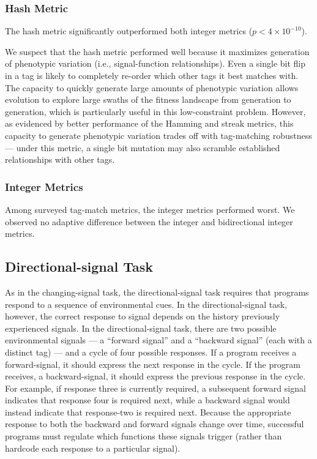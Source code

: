 \subsubsection{Hash Metric}

The hash metric significantly outperformed both integer metrics ($p < 4\times10^{-10}$).

We suspect that the hash metric performed well because it maximizes generation of phenotypic variation (i.e., signal-function relationships).
Even a single bit flip in a tag is likely to completely re-order which other tags it best matches with.
The capacity to quickly generate large amounts of phenotypic variation allows evolution to explore large swaths of the fitness landscape from generation to generation, which is particularly useful in this low-constraint problem.
However, as evidenced by better performance of the Hamming and streak metrics, this capacity to generate phenotypic variation trades off with tag-matching robustness --- under this metric, a single bit mutation may also scramble established relationships with other tags.

\subsubsection{Integer Metrics}

Among surveyed tag-match metrics, the integer metrics performed worst.
We observed no adaptive difference  between the integer and bidirectional integer metrics.

\subsection{Directional-signal Task} \label{sec:directional-signal}



As in the changing-signal task, the directional-signal task requires that programs respond to a sequence of environmental cues.
In the directional-signal task, however, the correct response to signal depends on the history previously experienced signals.
In the directional-signal task, there are two possible environmental signals --- a ``forward signal'' and a ``backward signal'' (each with a distinct tag) ---  and a cycle of four possible responses.
If a program receives a forward-signal, it should express the next response in the cycle.
If the program receives, a backward-signal, it should express the previous response in the cycle.
For example, if response three is currently required, a subsequent forward signal indicates that response four is required next, while a backward signal would instead indicate that response-two is required next.
Because the appropriate response to both the backward and forward signals change over time, successful programs must regulate which functions these signals trigger (rather than hardcode each response to a particular signal).

